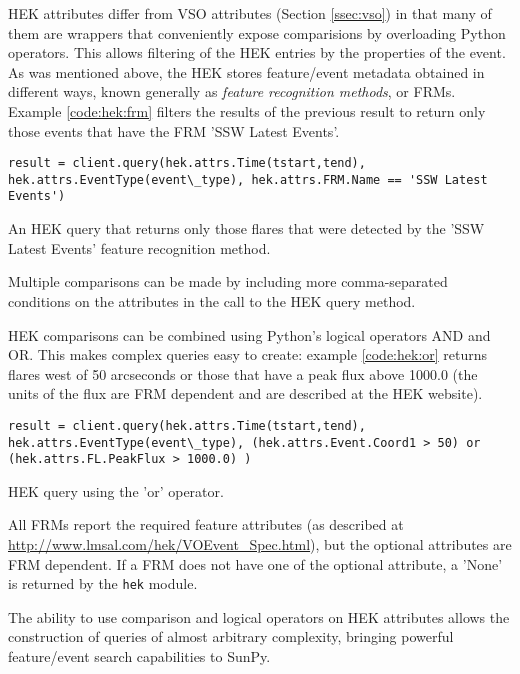 HEK attributes differ from VSO attributes (Section \ref{ssec:vso}) in
that many of them are wrappers that conveniently expose
comparisions by overloading Python operators.  This allows filtering
of the HEK entries by the properties of the event.  As was mentioned
above, the HEK stores feature/event metadata obtained in different
ways, known generally as {\it feature recognition methods}, or FRMs.
Example \ref{code:hek:frm} filters the results of the previous result
to return only those events that have the FRM 'SSW Latest Events'.
\begin{listing}[H]
\begin{verbatim}
result = client.query(hek.attrs.Time(tstart,tend), 
hek.attrs.EventType(event\_type), hek.attrs.FRM.Name == 'SSW Latest Events')
\end{verbatim}
\caption{An HEK query that returns only those flares that were
  detected by the 'SSW Latest Events' feature recognition method.}
\label{code:hek:frm}
\end{listing}
Multiple comparisons can be made by including more comma-separated
conditions on the attributes in the call to the HEK query method.

HEK comparisons can be combined using Python’s logical operators AND
and OR. This makes complex queries easy to create: example
\ref{code:hek:or} returns flares west of 50 arcseconds or those that
have a peak flux above 1000.0 (the units of the flux are FRM dependent
and are described at the HEK website).
\begin{listing}[H]
\begin{verbatim}
result = client.query(hek.attrs.Time(tstart,tend), 
hek.attrs.EventType(event\_type), (hek.attrs.Event.Coord1 > 50) or 
(hek.attrs.FL.PeakFlux > 1000.0) )
\end{verbatim}
\caption{HEK query using the 'or' operator.}
\label{code:hek:or}
\end{listing}
All FRMs report the required feature attributes (as described at
\url{http://www.lmsal.com/hek/VOEvent_Spec.html}), but the optional
attributes are FRM dependent.  If a FRM does not have one of the
optional attribute, a 'None' is returned by the \texttt{hek} module.

The ability to use comparison and logical operators on HEK attributes
allows the construction of queries of almost arbitrary complexity,
bringing powerful feature/event search capabilities to SunPy.
